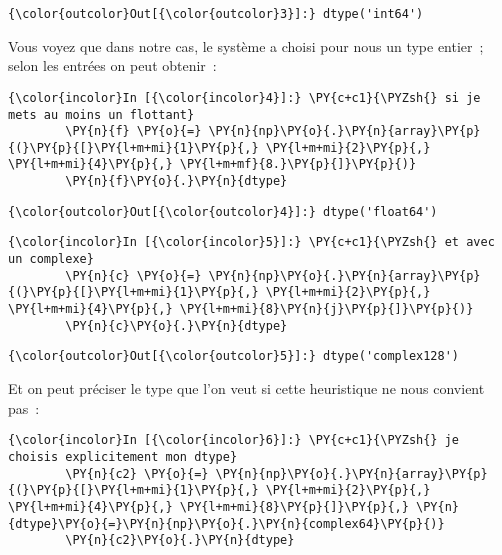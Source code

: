 \begin{Verbatim}[commandchars=\\\{\}]
{\color{outcolor}Out[{\color{outcolor}3}]:} dtype('int64')
\end{Verbatim}
            
    Vous voyez que dans notre cas, le système a choisi pour nous un type
entier~; selon les entrées on peut obtenir~:

    \begin{Verbatim}[commandchars=\\\{\}]
{\color{incolor}In [{\color{incolor}4}]:} \PY{c+c1}{\PYZsh{} si je mets au moins un flottant}
        \PY{n}{f} \PY{o}{=} \PY{n}{np}\PY{o}{.}\PY{n}{array}\PY{p}{(}\PY{p}{[}\PY{l+m+mi}{1}\PY{p}{,} \PY{l+m+mi}{2}\PY{p}{,} \PY{l+m+mi}{4}\PY{p}{,} \PY{l+m+mf}{8.}\PY{p}{]}\PY{p}{)}
        \PY{n}{f}\PY{o}{.}\PY{n}{dtype}
\end{Verbatim}


\begin{Verbatim}[commandchars=\\\{\}]
{\color{outcolor}Out[{\color{outcolor}4}]:} dtype('float64')
\end{Verbatim}
            
    \begin{Verbatim}[commandchars=\\\{\}]
{\color{incolor}In [{\color{incolor}5}]:} \PY{c+c1}{\PYZsh{} et avec un complexe}
        \PY{n}{c} \PY{o}{=} \PY{n}{np}\PY{o}{.}\PY{n}{array}\PY{p}{(}\PY{p}{[}\PY{l+m+mi}{1}\PY{p}{,} \PY{l+m+mi}{2}\PY{p}{,} \PY{l+m+mi}{4}\PY{p}{,} \PY{l+m+mi}{8}\PY{n}{j}\PY{p}{]}\PY{p}{)}
        \PY{n}{c}\PY{o}{.}\PY{n}{dtype}
\end{Verbatim}


\begin{Verbatim}[commandchars=\\\{\}]
{\color{outcolor}Out[{\color{outcolor}5}]:} dtype('complex128')
\end{Verbatim}
            
    Et on peut préciser le type que l'on veut si cette heuristique ne nous
convient pas~:

    \begin{Verbatim}[commandchars=\\\{\}]
{\color{incolor}In [{\color{incolor}6}]:} \PY{c+c1}{\PYZsh{} je choisis explicitement mon dtype}
        \PY{n}{c2} \PY{o}{=} \PY{n}{np}\PY{o}{.}\PY{n}{array}\PY{p}{(}\PY{p}{[}\PY{l+m+mi}{1}\PY{p}{,} \PY{l+m+mi}{2}\PY{p}{,} \PY{l+m+mi}{4}\PY{p}{,} \PY{l+m+mi}{8}\PY{p}{]}\PY{p}{,} \PY{n}{dtype}\PY{o}{=}\PY{n}{np}\PY{o}{.}\PY{n}{complex64}\PY{p}{)}
        \PY{n}{c2}\PY{o}{.}\PY{n}{dtype}
\end{Verbatim}


